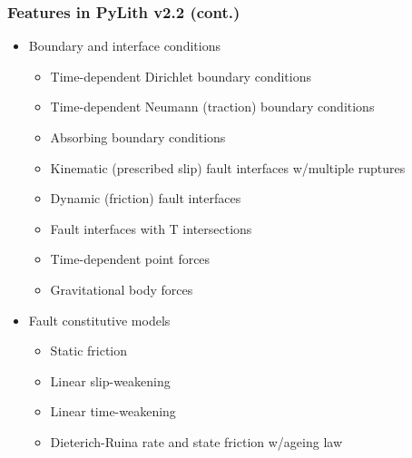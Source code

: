 \documentclass[aspectratio=169,hyperref=colorlinks]{beamer}
\begin{document}
\begin{frame}
  \frametitle{Features in PyLith v2.2 (cont.)}
  \summary{}

  \begin{itemize}
  \item Boundary and interface conditions
    \begin{itemize}
    \item Time-dependent Dirichlet boundary conditions
    \item Time-dependent Neumann (traction) boundary conditions
    \item Absorbing boundary conditions
    \item Kinematic (prescribed slip) fault interfaces w/multiple ruptures
    \item Dynamic (friction) fault interfaces
    \item Fault interfaces with T intersections
    \item Time-dependent point forces
    \item Gravitational body forces
    \end{itemize}
  \item Fault constitutive models
    \begin{itemize}
    \item Static friction
    \item Linear slip-weakening
    \item Linear time-weakening
    \item Dieterich-Ruina rate and state friction w/ageing law
   \end{itemize}
 \end{itemize}

\end{frame}
\end{document}

